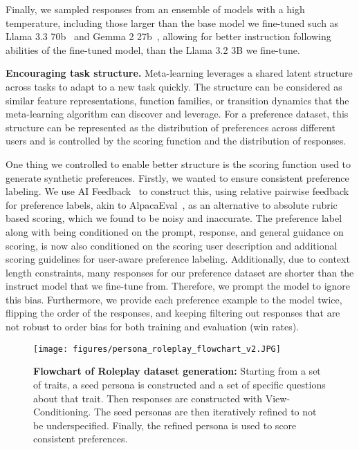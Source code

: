 Finally, we sampled responses from an ensemble of models with a high temperature, including those larger than the base model we fine-tuned such as Llama 3.3 70b~\citep{grattafiori2024llama} and Gemma 2 27b~\citep{gemmateam2024gemma2improvingopen}, allowing for better instruction following abilities of the fine-tuned model, than the Llama 3.2 3B we fine-tune.

\noindent \textbf{Encouraging task structure.}
Meta-learning leverages a shared latent structure across tasks to adapt to a new task quickly. The structure can be considered as similar feature representations, function families, or transition dynamics that the meta-learning algorithm can discover and leverage. For a preference dataset, this structure can be represented as the distribution of preferences across different users and is controlled by the scoring function and the distribution of responses.

One thing we controlled to enable better structure is the scoring function used to generate synthetic preferences. Firstly, we wanted to ensure consistent preference labeling. We use AI Feedback~\citep{bai2022constitutionalaiharmlessnessai} to construct this, using relative pairwise feedback for preference labels, akin to AlpacaEval~\citep{dubois2024alpacafarm}, as an alternative to absolute rubric based scoring, which we found to be noisy and inaccurate. The preference label along with being conditioned on the prompt, response, and general guidance on scoring, is now also conditioned on the scoring user description and additional scoring guidelines for user-aware preference labeling. Additionally, due to context length constraints, many responses for our preference dataset are shorter than the instruct model that we fine-tune from. Therefore, we prompt the model to ignore this bias. Furthermore, we provide each preference example to the model twice, flipping the order of the responses, and keeping filtering out responses that are not robust to order bias for both training and evaluation (win rates).

\begin{figure}[t]
    \centering
    \texttt{[image: figures/persona\_roleplay\_flowchart\_v2.JPG]}
    \vspace{-0.4cm}
    \caption{\footnotesize \textbf{Flowchart of Roleplay dataset generation:} Starting from a set of traits, a seed persona is constructed and a set of specific questions about that trait. Then responses are constructed with View-Conditioning. The seed personas are then iteratively refined to not be underspecified. Finally, the refined persona is used to score consistent preferences.}
    \label{fig:flowchart}
    \vspace{-0.2cm}
\end{figure}


